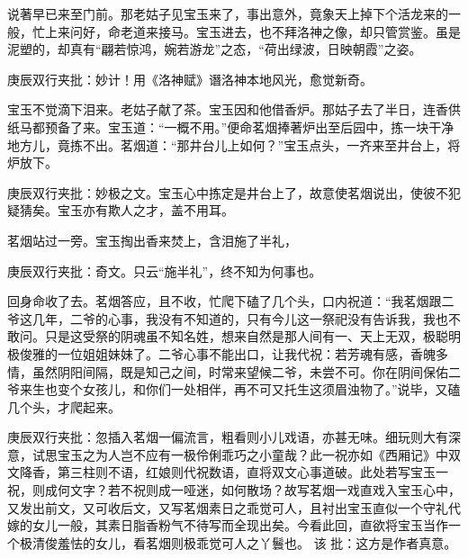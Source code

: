 \begin{parag}
    说著早已来至门前。那老姑子见宝玉来了，事出意外，竟象天上掉下个活龙来的一般，忙上来问好，命老道来接马。宝玉进去，也不拜洛神之像，却只管赏鉴。虽是泥塑的，却真有“翩若惊鸿，婉若游龙”之态，“荷出绿波，日映朝霞”之姿。\begin{note}庚辰双行夹批：妙计！用《洛神赋》谮洛神本地风光，愈觉新奇。\end{note}宝玉不觉滴下泪来。老姑子献了茶。宝玉因和他借香炉。那姑子去了半日，连香供纸马都预备了来。宝玉道：“一概不用。”便命茗烟捧著炉出至后园中，拣一块干净地方儿，竟拣不出。茗烟道：“那井台儿上如何？”宝玉点头，一齐来至井台上，将炉放下。\begin{note}庚辰双行夹批：妙极之文。宝玉心中拣定是井台上了，故意使茗烟说出，使彼不犯疑猜矣。宝玉亦有欺人之才，盖不用耳。\end{note}
\end{parag}


\begin{parag}
    茗烟站过一旁。宝玉掏出香来焚上，含泪施了半礼，\begin{note}庚辰双行夹批：奇文。只云“施半礼”，终不知为何事也。\end{note}回身命收了去。茗烟答应，且不收，忙爬下磕了几个头，口内祝道：“我茗烟跟二爷这几年，二爷的心事，我没有不知道的，只有今儿这一祭祀没有告诉我，我也不敢问。只是这受祭的阴魂虽不知名姓，想来自然是那人间有一、天上无双，极聪明极俊雅的一位姐姐妹妹了。二爷心事不能出口，让我代祝：若芳魂有感，香魄多情，虽然阴阳间隔，既是知己之间，时常来望候二爷，未尝不可。你在阴间保佑二爷来生也变个女孩儿，和你们一处相伴，再不可又托生这须眉浊物了。”说毕，又磕几个头，才爬起来。\begin{note}庚辰双行夹批：忽插入茗烟一偏流言，粗看则小儿戏语，亦甚无味。细玩则大有深意，试思宝玉之为人岂不应有一极伶俐乖巧之小童哉？此一祝亦如《西厢记》中双文降香，第三柱则不语，红娘则代祝数语，直将双文心事道破。此处若写宝玉一祝，则成何文字？若不祝则成一哑迷，如何散场？故写茗烟一戏直戏入宝玉心中，又发出前文，又可收后文，又写茗烟素日之乖觉可人，且衬出宝玉直似一个守礼代嫁的女儿一般，其素日脂香粉气不待写而全现出矣。今看此回，直欲将宝玉当作一个极清俊羞怯的女儿，看茗烟则极乖觉可人之丫鬟也。 该 批：这方是作者真意。\end{note}
\end{parag}


